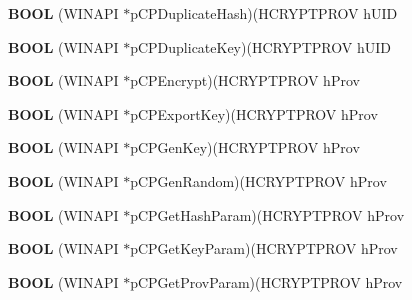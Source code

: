 \begin{DoxyCompactItemize}
{\bfseries B\+O\+OL} (W\+I\+N\+A\+PI $\ast$p\+C\+P\+Duplicate\+Hash)(H\+C\+R\+Y\+P\+T\+P\+R\+OV h\+U\+ID
\item 
\mbox{\label{structtag_p_r_o_v_f_u_n_c_s_ad82afa94331164aee06df80e2d10f171}} 
{\bfseries B\+O\+OL} (W\+I\+N\+A\+PI $\ast$p\+C\+P\+Duplicate\+Key)(H\+C\+R\+Y\+P\+T\+P\+R\+OV h\+U\+ID
\item 
\mbox{\label{structtag_p_r_o_v_f_u_n_c_s_ab760fb407f834d4ea4fca172aed3b0b9}} 
{\bfseries B\+O\+OL} (W\+I\+N\+A\+PI $\ast$p\+C\+P\+Encrypt)(H\+C\+R\+Y\+P\+T\+P\+R\+OV h\+Prov
\item 
\mbox{\label{structtag_p_r_o_v_f_u_n_c_s_a075aeb1a948e6237ef7f69c5567c29a1}} 
{\bfseries B\+O\+OL} (W\+I\+N\+A\+PI $\ast$p\+C\+P\+Export\+Key)(H\+C\+R\+Y\+P\+T\+P\+R\+OV h\+Prov
\item 
\mbox{\label{structtag_p_r_o_v_f_u_n_c_s_a91a222a20bdcd17cae3b45706247d2d4}} 
{\bfseries B\+O\+OL} (W\+I\+N\+A\+PI $\ast$p\+C\+P\+Gen\+Key)(H\+C\+R\+Y\+P\+T\+P\+R\+OV h\+Prov
\item 
\mbox{\label{structtag_p_r_o_v_f_u_n_c_s_a3dcb0ce6b0b363de4997ed5009ced30a}} 
{\bfseries B\+O\+OL} (W\+I\+N\+A\+PI $\ast$p\+C\+P\+Gen\+Random)(H\+C\+R\+Y\+P\+T\+P\+R\+OV h\+Prov
\item 
\mbox{\label{structtag_p_r_o_v_f_u_n_c_s_aadeb1b7ca0c2adf54bf353d05a618d95}} 
{\bfseries B\+O\+OL} (W\+I\+N\+A\+PI $\ast$p\+C\+P\+Get\+Hash\+Param)(H\+C\+R\+Y\+P\+T\+P\+R\+OV h\+Prov
\item 
\mbox{\label{structtag_p_r_o_v_f_u_n_c_s_aee51cd67b276877597089bf958630c0c}} 
{\bfseries B\+O\+OL} (W\+I\+N\+A\+PI $\ast$p\+C\+P\+Get\+Key\+Param)(H\+C\+R\+Y\+P\+T\+P\+R\+OV h\+Prov
\item 
\mbox{\label{structtag_p_r_o_v_f_u_n_c_s_aa678c3457179105b6e276c1b320f5684}} 
{\bfseries B\+O\+OL} (W\+I\+N\+A\+PI $\ast$p\+C\+P\+Get\+Prov\+Param)(H\+C\+R\+Y\+P\+T\+P\+R\+OV h\+Prov
\item 
\mbox{\label{structtag_p_r_o_v_f_u_n_c_s_a5ace8f5007872f31ea81e29cb3eeaff3}} 

\end{DoxyCompactItemize}
